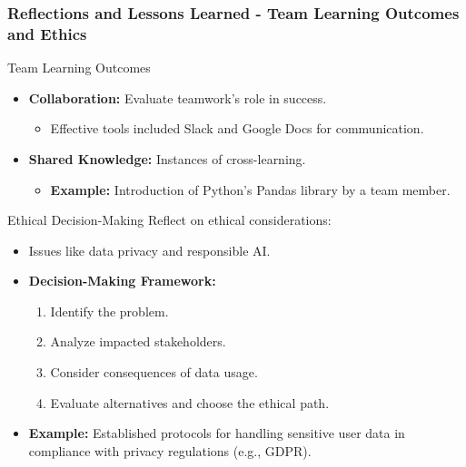 \documentclass[aspectratio=169]{beamer}
\begin{document}
\begin{frame}[fragile]
  \frametitle{Reflections and Lessons Learned - Team Learning Outcomes and Ethics}
  \begin{block}{Team Learning Outcomes}
    \begin{itemize}
      \item \textbf{Collaboration:} Evaluate teamwork’s role in success.
        \begin{itemize}
          \item Effective tools included Slack and Google Docs for communication.
        \end{itemize}
      \item \textbf{Shared Knowledge:} Instances of cross-learning.
        \begin{itemize}
          \item \textbf{Example:} Introduction of Python's Pandas library by a team member.
        \end{itemize}
    \end{itemize}
  \end{block}
  
  \begin{block}{Ethical Decision-Making}
    Reflect on ethical considerations:
    \begin{itemize}
      \item Issues like data privacy and responsible AI.
      \item \textbf{Decision-Making Framework:}
      \begin{enumerate}
        \item Identify the problem.
        \item Analyze impacted stakeholders.
        \item Consider consequences of data usage.
        \item Evaluate alternatives and choose the ethical path.
      \end{enumerate}
      \item \textbf{Example:} Established protocols for handling sensitive user data in compliance with privacy regulations (e.g., GDPR).
    \end{itemize}
  \end{block}
\end{frame}
\end{document}
